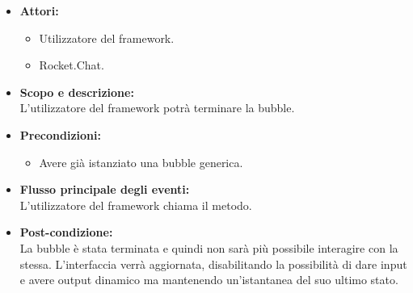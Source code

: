\begin{itemize}
	\item \textbf{Attori:}
	\begin{itemize}
		\item Utilizzatore del framework.
		\item Rocket.Chat.
	\end{itemize}
	\item \textbf{Scopo e descrizione:} 
	\\L'utilizzatore del framework potrà terminare la bubble.
	\item \textbf{Precondizioni:}
	\begin{itemize}
		\item Avere già istanziato una bubble generica.
	\end{itemize}
	\item \textbf{Flusso principale degli eventi:}
	\\L'utilizzatore del framework chiama il metodo.
	\item \textbf{Post-condizione:}
	\\La bubble è stata terminata e quindi non sarà più possibile interagire con la stessa. L'interfaccia verrà aggiornata, disabilitando la possibilità di dare input e avere output dinamico ma mantenendo un'istantanea del suo ultimo stato.
\end{itemize}